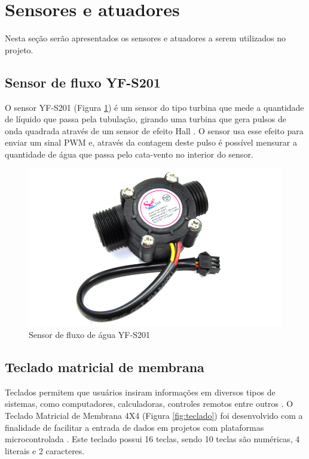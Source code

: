 \section{Sensores e atuadores}

Nesta seção serão apresentados os sensores e atuadores a serem utilizados no projeto. 

\subsection{Sensor de fluxo YF-S201}

O sensor YF-S201 (Figura \ref{fig:sensor}) é um sensor do tipo turbina que mede a quantidade de líquido que passa pela tubulação, girando uma turbina que
gera pulsos de onda quadrada através de um sensor de efeito Hall \cite{roque2018sistema}. O
sensor usa esse efeito para enviar um sinal PWM e, através da contagem deste pulso é possível mensurar a quantidade de água que passa pelo cata-vento no interior do sensor. \cite{ms2017automaccao}

\begin{figure}[htbp]
		\centering
		\includegraphics[scale=0.3]{figuras/yf-s201.jpg}
		\caption{Sensor de fluxo de água YF-S201}
		\label{fig:sensor}
\end{figure}

\subsection{Teclado matricial de membrana}

Teclados permitem que usuários insiram informações em diversos tipos de sistemas, como computadores, calculadoras, controles remotos entre outros \cite{teclado-matricial-1}. O Teclado Matricial de Membrana 4X4 (Figura \ref{fig:teclado}) foi desenvolvido com a finalidade de facilitar a entrada de dados em projetos com plataformas microcontrolada \cite{teclado-matricial}. Este teclado possui 16 teclas, sendo 10 teclas são numéricas, 4 literais e 2 caracteres. 
	
